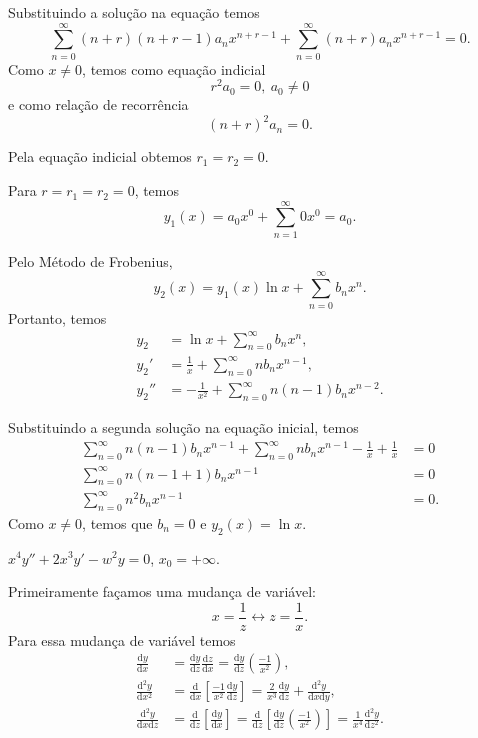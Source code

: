 \documentclass[a4paper,12pt, leqno, answers]{exam}
\newcommand{\devd}[2]{\frac{\text{d} #1}{\text{d} #2}}
\newcommand{\devdt}[2]{\frac{\text{d$^2$} #1}{\text{d} #2^2}}
\newcommand{\devdtm}[3]{\frac{\text{d$^2$} #1}{\text{d} #2 \text{d} #3}}
\begin{document}
\begin{questions}
\begin{solution}
        Substituindo a solu\c{c}\~{a}o na equa\c{c}\~{a}o temos
        \[
        \sum_{n = 0}^\infty \left( n + r \right) \left( n + r - 1 \right) a_n x^{n + r - 1} + \sum_{n = 0}^\infty \left( n + r \right) a_n x^{n + r - 1} = 0.
        \]
        Como $x \neq 0$, temos como equa\c{c}\~{a}o indicial
        \[
        r^2 a_0 = 0, \ a_0 \neq 0
        \]
        e como rela\c{c}\~{a}o de recorr\^{e}ncia
        \[
        \left( n + r \right)^2 a_n = 0.
        \]

        Pela equa\c{c}\~{a}o indicial obtemos $r_1 = r_2 = 0$.

        Para $r = r_1 = r_2 = 0$, temos
        \[
        y_1(x) = a_0 x^0 + \sum_{n = 1}^\infty 0 x^0 = a_0.
        \]

        Pelo M\'{e}todo de Frobenius,
        \[
        y_2(x) = y_1(x) \ln x + \sum_{n = 0}^\infty b_n x^n.
        \]
        Portanto, temos
        \begin{align*}
            y_2 &= \ln x + \sum_{n = 0}^\infty b_n x^n, \\
            y_2' &= \frac{1}{x} + \sum_{n = 0}^\infty n b_n x^{n - 1}, \\
            y_2'' &= -\frac{1}{x^2} + \sum_{n = 0}^\infty n \left( n - 1 \right) b_n x^{n - 2}.
        \end{align*}

        Substituindo a segunda solu\c{c}\~{a}o na equa\c{c}\~{a}o inicial, temos
        \begin{align*}
            \sum_{n = 0}^\infty n \left( n -1 \right) b_n x^{n - 1} + \sum_{n = 0}^\infty n b_n x^{n - 1} - \frac{1}{x} + \frac{1}{x} &= 0 \\
            \sum_{n = 0}^\infty n \left( n - 1 + 1 \right) b_n x^{n - 1} &= 0 \\
            \sum_{n = 0}^\infty n^2 b_n x^{n - 1} &= 0.
        \end{align*}
        Como $x \neq 0$, temos que $b_n = 0$ e $y_2(x) = \ln x$.
    \end{solution}

    \question $x^4 y'' + 2 x^3 y' - w^2 y = 0$, $x_0 = + \infty$.
    \begin{solution}
        Primeiramente fa\c{c}amos uma mudan\c{c}a de vari\'{a}vel:
        \[
        x = \frac{1}{z} \leftrightarrow z = \frac{1}{x}.
        \]
        Para essa mudan\c{c}a de vari\'{a}vel temos
        \begin{align*}
            \devd{y}{x} &= \devd{y}{z} \devd{z}{x} = \devd{y}{z} \left( \frac{-1}{x^2} \right), \\
            \devdt{y}{x} &=\devd{}{x} \left[ \frac{-1}{x^2} \devd{y}{z} \right] = \frac{2}{x^3} \devd{y}{z} + \devdtm{y}{x}{y}, \\
            \devdtm{y}{x}{z} &= \devd{}{z} \left[ \devd{y}{x} \right] = \devd{}{z} \left[ \devd{y}{z} \left( \frac{-1}{x^2} \right) \right] = \frac{1}{x^4} \devdt{y}{z}.
        \end{align*}


\end{solution}
\end{questions}
\end{document}
